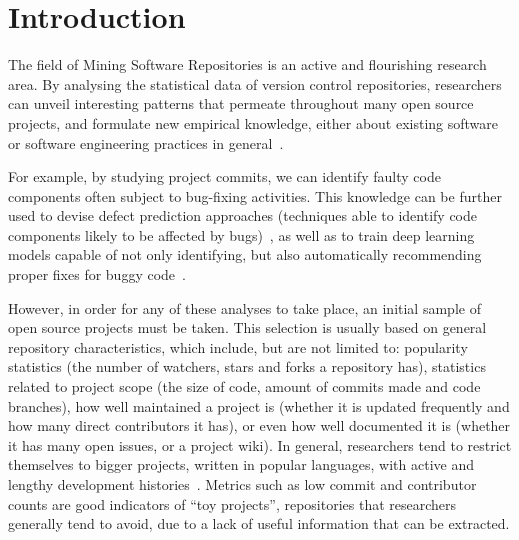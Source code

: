 \chapter{Introduction}

The field of Mining Software Repositories is an active and flourishing research area.
By analysing the statistical data of version control repositories, researchers can unveil interesting patterns that permeate throughout many open source projects, and formulate new empirical knowledge, either about existing software or software engineering practices in general~\cite{MSR}.

For example, by studying project commits, we can identify faulty code components often subject to bug-fixing activities.
This knowledge can be further used to devise defect prediction approaches (techniques able to identify code components likely to be affected by bugs)~\cite{DEFECT1,DEFECT2}, as well as to train deep learning models capable of not only identifying, but also automatically recommending proper fixes for buggy code~\cite{BUGFIX}.

However, in order for any of these analyses to take place, an initial sample of open source projects must be taken.
This selection is usually based on general repository characteristics, which include, but are not limited to: popularity statistics (the number of watchers, stars and forks a repository has), statistics related to project scope (the size of code, amount of commits made and code branches), how well maintained a project is (whether it is updated frequently and how many direct contributors it has), or even how well documented it is (whether it has many open issues, or a project wiki).
In general, researchers tend to restrict themselves to bigger projects, written in popular languages, with active and lengthy development histories~\cite{PDSSE}.
Metrics such as low commit and contributor counts are good indicators of ``toy projects'', repositories that researchers generally tend to avoid, due to a lack of useful information that can be extracted.

